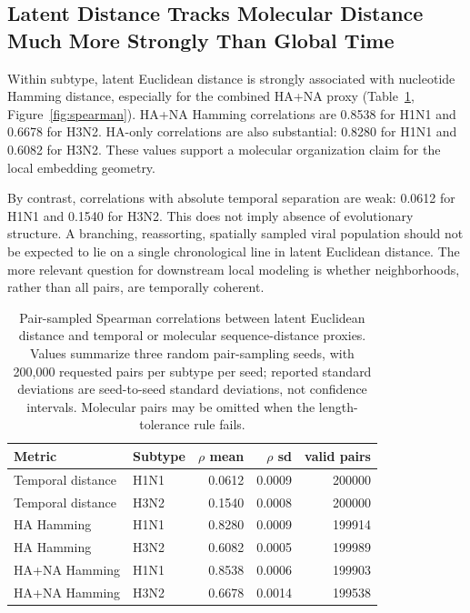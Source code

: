 \documentclass[11pt]{article}
\begin{document}
\subsection{Latent Distance Tracks Molecular Distance Much More Strongly Than Global Time}

Within subtype, latent Euclidean distance is strongly associated with nucleotide Hamming distance, especially for the combined HA+NA proxy (Table~\ref{tab:spearman}, Figure~\ref{fig:spearman}). HA+NA Hamming correlations are 0.8538 for H1N1 and 0.6678 for H3N2. HA-only correlations are also substantial: 0.8280 for H1N1 and 0.6082 for H3N2. These values support a molecular organization claim for the local embedding geometry.

By contrast, correlations with absolute temporal separation are weak: 0.0612 for H1N1 and 0.1540 for H3N2. This does not imply absence of evolutionary structure. A branching, reassorting, spatially sampled viral population should not be expected to lie on a single chronological line in latent Euclidean distance. The more relevant question for downstream local modeling is whether neighborhoods, rather than all pairs, are temporally coherent.

\begin{table}[H]
\centering
\caption{Pair-sampled Spearman correlations between latent Euclidean distance and temporal or molecular sequence-distance proxies. Values summarize three random pair-sampling seeds, with 200,000 requested pairs per subtype per seed; reported standard deviations are seed-to-seed standard deviations, not confidence intervals. Molecular pairs may be omitted when the length-tolerance rule fails.}
\label{tab:spearman}
\begin{tabular}{llrrr}
\toprule
Metric & Subtype & $\rho$ mean & $\rho$ sd & valid pairs \\
\midrule
Temporal distance & H1N1 & 0.0612 & 0.0009 & 200000 \\
Temporal distance & H3N2 & 0.1540 & 0.0008 & 200000 \\
HA Hamming & H1N1 & 0.8280 & 0.0009 & 199914 \\
HA Hamming & H3N2 & 0.6082 & 0.0005 & 199989 \\
HA+NA Hamming & H1N1 & 0.8538 & 0.0006 & 199903 \\
HA+NA Hamming & H3N2 & 0.6678 & 0.0014 & 199538 \\
\bottomrule
\end{tabular}
\end{table}
\end{document}

